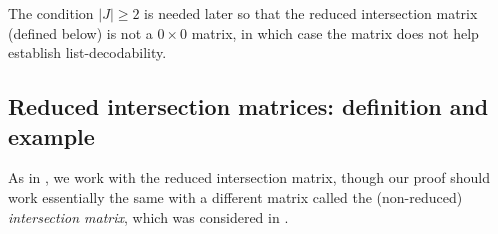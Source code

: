 \documentclass{article}[11pt]
\begin{document}
\begin{remark}
    The condition $|J|\ge 2$ is needed later so that the reduced intersection matrix (defined below) is not a $0\times 0$ matrix, in which case the matrix does not help establish list-decodability.
\end{remark}



\subsection{Reduced intersection matrices: definition and example}

As in \cite{GZ23}, we work with the reduced intersection matrix, though our proof should work essentially the same with a different matrix called the (non-reduced) \emph{intersection matrix}, which was considered in \cite{ST20, GLSTW21, BGM23}.
\end{document}
